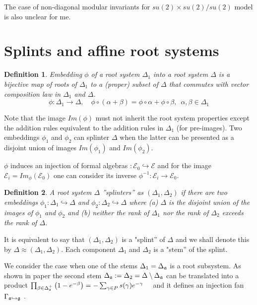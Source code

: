 \documentclass[12pt]{article}
\newtheorem{Def}{Definition}[section]
\begin{document}
The case of non-diagonal modular invariants for $su(2)\times
su(2)/su(2)$ model is also unclear for me.


\section{Splints and affine root systems}
\label{sec:splints-affine-root}

\begin{Def}
  Embedding $\phi$ of a root system $\Delta_1$ into a root system $\Delta$ is a bijective map of
  roots of $\Delta_{1}$ to a (proper) subset of $\Delta$ that commutes with vector composition law
  in $\Delta_{1}$ and $\Delta$.
\begin{equation*}
\phi:\Delta_1 \longrightarrow \Delta, \quad \phi \circ (\alpha + \beta) =\phi \circ \alpha + \phi \circ \beta,\,\,\, \alpha,\beta \in \Delta_1
\end{equation*}
\end{Def}

Note that the image $Im(\phi)$ must not inherit the root system properties except the addition rules
equivalent to the addition rules in $\Delta_{1}$ (for pre-images). Two embeddings $\phi_1$ and
$\phi_2$ can splinter $\Delta$ when the latter can be presented as a disjoint union of images
$Im(\phi_1)$ and $Im(\phi_2)$.

$\phi$ induces an injection of formal algebras $:{\mathcal{E}}_0
\hookrightarrow \mathcal{E}$ and for the image ${\mathcal{E}}%
_i=Im_{\phi}\left( {\mathcal{E}}_0\right)$ one can consider its inverse $%
\phi^{-1}:{\mathcal{E}}_i \longrightarrow {\mathcal{E}}_0$.

\begin{Def}
  A root system $\Delta $ ''splinters'' as $(\Delta _{1},\Delta _{2})$ if there are two embeddings
  $\phi _{1}:\Delta _{1}\hookrightarrow \Delta $ and $%
  \phi _{2}:\Delta _{2}\hookrightarrow \Delta $ where (a) $\Delta $ is the disjoint union of the
  images of $\phi _{1}$ and $\phi _{2}$ and (b) neither the rank of $\Delta _{1}$ nor the rank of
  $\Delta _{2}$ exceeds the rank of $%
  \Delta $.
\end{Def}

It is equivalent to say that $(\Delta_1,\Delta_2)$ is a "splint'' of $\Delta$ and we shall denote
this by $\Delta \approx (\Delta_1,\Delta_2)$. Each component $\Delta_1$ and $\Delta_2$ is a "stem''
of the splint.


We consider the case when one of the stems $\Delta _{1}=\Delta _{\frak{a}}$ is a root subsystem. As shown in paper \cite{2011arXiv1111.6787L} the second stem $\Delta _{\frak{s}}:=\Delta
_{2}=\Delta \setminus \Delta _{\frak{a}}$ can be translated into a product
$\prod_{\beta \in \Delta _{\frak{s}}^{+}}\left( 1-e^{-\beta }\right)=-\sum_{\gamma \in P}s(\gamma )e^{-\gamma }\quad   \label{splint product}$
and it defines an injection fan $\Gamma _{\frak{a}%
\hookrightarrow \frak{g}}$ \cite{lyakhovsky1996rra,ilyin812pbc,2010arXiv1007.0318L}.
\end{document}
